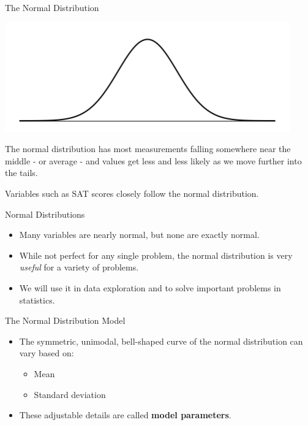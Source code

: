 \begin{frame}{The Normal Distribution}
    \begin{center}
        \includegraphics[scale=0.5]{images/normalcurve.png}
    \end{center}
    
    The normal distribution has most measurements falling somewhere near the middle - or average - and values get less and less likely as we move further into the tails.
    
    \vspace{12pt}Variables such as SAT scores closely follow the normal distribution.
\end{frame}

\begin{frame}{Normal Distributions}
    \begin{itemize}
        \item Many variables are nearly normal, but none are exactly normal. 
        \item While not perfect for any single problem, the normal distribution is very \textit{useful} for a variety of problems. 
        \item We will use it in data exploration and to solve important problems in statistics.
    \end{itemize}
\end{frame}

\begin{frame}{The Normal Distribution Model}
    \begin{itemize}
        \item The symmetric, unimodal, bell-shaped curve of the normal distribution can vary based on:
        \begin{itemize}
            \item Mean
            \item Standard deviation
        \end{itemize}
        \item These adjustable details are called \textbf{model parameters}.
    \end{itemize}
\end{frame}


